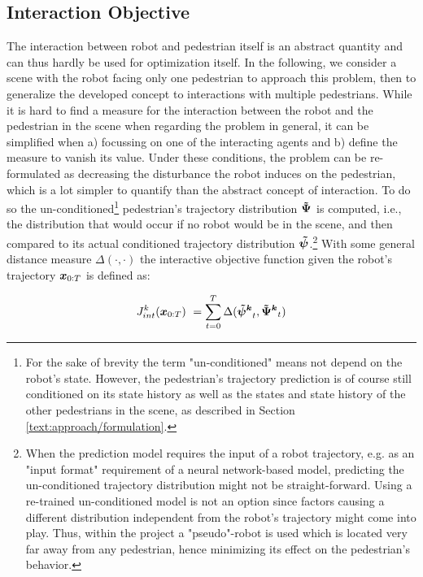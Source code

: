 \subsection{Interaction Objective}
\label{text:approach/objective/interactive}
The interaction between robot and pedestrian itself is an abstract quantity and can thus hardly be used for optimization itself. In the following, we consider a scene with the robot facing only one pedestrian to approach this problem, then to generalize the developed concept to interactions with multiple pedestrians.  
\newline
While it is hard to find a measure for the interaction between the robot and the pedestrian in the scene when regarding the problem in general, it can be simplified when a) focussing on one of the interacting agents and b) define the measure to vanish its value. Under these conditions, the problem can be re-formulated as decreasing the disturbance the robot induces on the pedestrian, which is a lot simpler to quantify than the abstract concept of interaction. To do so the un-conditioned\footnote{For the sake of brevity the term "un-conditioned" means not depend on the robot's state. However, the pedestrian's trajectory prediction is of course still conditioned on its state history as well as the states and state history of the other pedestrians in the scene, as described in Section \ref{text:approach/formulation}.} pedestrian's trajectory distribution $\distwo[]$ is computed, i.e., the distribution that would occur if no robot would be in the scene, and then compared to its actual conditioned trajectory distribution $\dist[]$.\footnote{When the prediction model requires the input of a robot trajectory, e.g. as an "input format" requirement of a neural network-based model, predicting the un-conditioned trajectory distribution might not be straight-forward. Using a re-trained un-conditioned model is not an option since factors causing a different distribution independent from the robot's trajectory might come into play. Thus, within the project a "pseudo"-robot is used which is located very far away from any pedestrian, hence minimizing its effect on the pedestrian's behavior.} With some general distance measure $\Delta(\cdot, \cdot)$ the interactive objective function given the robot's trajectory $\boldsymbol{x}_{0:T}$ is defined as:

\begin{equation}
J_{int}^k(\x_{0:T}) = \sum_{t=0}^T \Delta(\dist[k]_t, \distwo[k]_t)
\label{eq:objective_interaction}
\end{equation}

